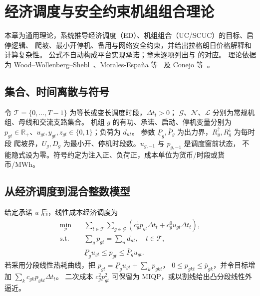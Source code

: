 
\section{经济调度与安全约束机组组合理论}\label{sec:ts-th-scuc}

\begin{theorynote}
本章为通用理论，系统推导经济调度（ED）、机组组合（UC/SCUC）的目标、启停逻辑、
爬坡、最小开停机、备用与网络安全约束，并给出拉格朗日价格解释和计算复杂性。
公式不自动构成平台实现承诺；章末逐项列出与
 的对应。
理论依据为 Wood--Wollenberg--Shebl~\cite{ts:wood}、Morales-Espa\~na 等~\cite{ts:morales}
及 Conejo 等~\cite{ts:conejo}。
\end{theorynote}

\subsection{集合、时间离散与符号}
令 $\mathcal T=\{0,\ldots,T-1\}$ 为等长或变长调度时段，$\Delta t_t>0$；
$\mathcal G$、$\mathcal N$、$\mathcal L$ 分别为常规机组、母线和交流支路集合。
机组 $g$ 的有功、承诺、启动、停机变量分别为
$p_{gt}\in\mathbb R_+$、$u_{gt},y_{gt},z_{gt}\in\{0,1\}$；负荷为 $d_{nt}$。
参数 $\underline P_g,\overline P_g$ 为出力界，$R_g^\uparrow,R_g^\downarrow$ 为每时段
爬坡界，$U_g,D_g$ 为最小开、停机时段数。$u_{g,-1}$ 与 $p_{g,-1}$ 是调度窗前状态，
不能隐式设为零。符号约定为注入正、负荷正，成本单位为货币/时段或货币/MWh。

\subsection{从经济调度到混合整数模型}
给定承诺 $u$ 后，线性成本经济调度为
\begin{align}
\min_p\quad &\sum_{t\in\mathcal T}\sum_{g\in\mathcal G}
 (c_g^1p_{gt}\Delta t_t+c_g^0u_{gt}\Delta t_t),\label{eq:ts-ed-obj}\\
\text{s.t.}\quad&\sum_g p_{gt}=\sum_n d_{nt},\quad t\in\mathcal T,\label{eq:ts-ed-bal}\\
&\underline P_gu_{gt}\le p_{gt}\le\overline P_gu_{gt}.\label{eq:ts-ed-cap}
\end{align}
若采用分段线性热耗曲线，把 $p_{gt}=\underline P_gu_{gt}+\sum_kp_{gkt}$，
$0\le p_{gkt}\le\overline p_{gk}$，并令目标增加 $\sum_kc_{gk}p_{gkt}\Delta t_t$。
二次成本 $c_g^2p_{gt}^2$ 可保留为 MIQP，或以割线给出凸分段线性外逼近。

